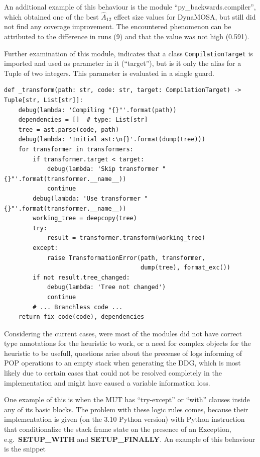 \documentclass[%
  chapterprefix=false,%
  open=right,%
  twoside=true,%
  paper=a4,%
  logofile={Figures/logo.png},%
  thesistype=master,%
  UKenglish,%
]{se2thesis}
\newcommand{\classname}[1]{\texttt{#1}}
\begin{document}
An additional example of this behaviour is the module ``py\_backwards.compiler'', which obtained one of the best \(\hat{A}_{12}\) effect size values for DynaMOSA, but still did not find any coverage improvement.
The encountered phenomenon can be attributed to the difference in runs (9) and that the value was not high (0.591).

Further examination of this module, indicates that a class \classname{CompilationTarget} is imported and used as parameter in it (``target''), but is it only the alias for a Tuple of two integers.
This parameter is evaluated in a single guard.

\begin{verbatim}
def _transform(path: str, code: str, target: CompilationTarget) -> Tuple[str, List[str]]:
    debug(lambda: 'Compiling "{}"'.format(path))
    dependencies = []  # type: List[str]
    tree = ast.parse(code, path)
    debug(lambda: 'Initial ast:\n{}'.format(dump(tree)))
    for transformer in transformers:
        if transformer.target < target:
            debug(lambda: 'Skip transformer "{}"'.format(transformer.__name__))
            continue
        debug(lambda: 'Use transformer "{}"'.format(transformer.__name__))
        working_tree = deepcopy(tree)
        try:
            result = transformer.transform(working_tree)
        except:
            raise TransformationError(path, transformer,
                                      dump(tree), format_exc())
        if not result.tree_changed:
            debug(lambda: 'Tree not changed')
            continue
        # ... Branchless code ...
    return fix_code(code), dependencies
\end{verbatim}

Considering the current cases, were most of the modules did not have correct type annotations for the heuristic to work, or a need for complex objects for the heuristic to be usefull, questions arise about the precense of logs informing of POP operations to an empty stack when generating the DDG, which is most likely due to certain cases that could not be resolved completely in the implementation and might have caused a variable information loss.\@

One example of this is when the MUT has ``try-except'' or ``with'' clauses inside any of its basic blocks.
The problem with these logic rules comes, because their implementation is given (on the 3.10 Python version) with Python instruction that conditionalize the stack frame state on the presence of an Exception, e.g.~\textbf{SETUP\_WITH} and \textbf{SETUP\_FINALLY}.
An example of this behaviour is the snippet
\end{document}
